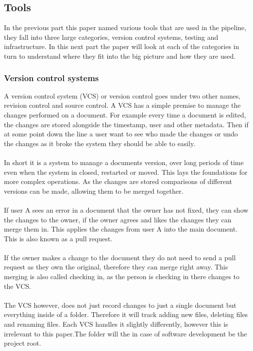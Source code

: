 \subsection{Tools}

In the previous part this paper named various tools that are used in the pipeline, they fall into three large categories, version control systems, testing  and infrastructure. In this next part the paper will look at each of the categories in turn to understand where they fit into the big picture and how they are used.

\subsubsection{Version control systems}

A version control system (VCS) or version control goes under two other names, revision control and source control. A VCS has a simple premise to manage the changes performed on a document. For example every time a document is edited, the changes are stored alongside the timestamp, user and other metadata. Then if at some point down the line a user want to see who made the changes or undo the changes as it broke the system they should be able to easily. 
\\\\
In short it is a system to manage a documents version, over long periods of time even when the system in closed, restarted or moved. This lays the foundations for more complex operations. As the changes are stored comparisons of different versions can be made, allowing them to be merged together.
\\\\
If user A sees an error in a document that the owner has not fixed, they can show the changes to the owner, if the owner agrees and likes the changes they can merge them in. This applies the changes from user A into the main document. This is also known as a pull request.
\\\\
If the owner makes a change to the document they do not need to send a pull request as they own the original, therefore they can merge right away. This merging is also called checking in, as the person is checking in there changes to the VCS.
\\\\
The VCS however, does not just record changes to just a single document but everything inside of a folder. Therefore it will track adding new files, deleting files and renaming files. Each VCS handles it slightly differently, however this is irrelevant to this paper.The folder will the in case of software development be the project root.
